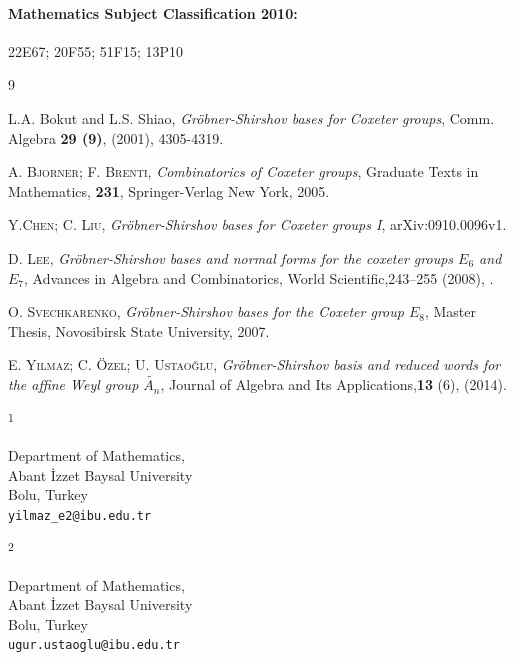 \documentclass{article}
\newcommand{\ADDRESS}[2]{\noindent
  \textsuperscript{#1}\parbox[t]{0.9\textwidth}{#2} \vspace{6pt}}
\newcommand{\MSCLASSIFICATION}[1]{\paragraph{Mathematics Subject Classification 2010:} #1}
\begin{document}
\MSCLASSIFICATION{22E67; 20F55; 51F15; 13P10}





\begin{thebibliography}{9}

 L.A. Bokut and L.S. Shiao, \emph{Gr\"{o}bner-Shirshov bases for Coxeter groups}, Comm. Algebra \textbf{29 (9)}, (2001), 4305-4319.

 \textsc{A. Bjorner;  F. Brenti}, \emph{Combinatorics of Coxeter groups}, Graduate Texts in Mathematics, \textbf{231}, Springer-Verlag New York, 2005.

 \textsc{Y.Chen; C. Liu}, \emph{Gr\"{o}bner-Shirshov bases for Coxeter groups I}, arXiv:0910.0096v1.

 \textsc{D. Lee}, \emph{Gr\"{o}bner-Shirshov bases and normal forms for the coxeter groups $E_6$ and $E_7$}, Advances in Algebra and Combinatorics, World Scientific,243--255 (2008), .


 \textsc{O. Svechkarenko}, \emph{Gr\"{o}bner-Shirshov bases for the Coxeter group $E_8$}, Master Thesis, Novosibirsk State University, 2007.

\textsc{ E. Y{\i}lmaz; C. \"{O}zel; U. Ustao\v{g}lu}, \emph{Gr\"{o}bner-Shirshov basis and reduced words for the affine Weyl group $\tilde{A_n}$}, Journal of Algebra and Its Applications,\textbf{13} (6), (2014).
\\
\end{thebibliography}

\vspace{1cm}

\ADDRESS{1}{
Department of Mathematics,\\Abant \.{I}zzet Baysal University \\
Bolu, Turkey \\
\texttt{yilmaz\_e2@ibu.edu.tr}
}

\vspace{.5cm}

\ADDRESS{2}{
Department of Mathematics,\\Abant \.{I}zzet Baysal University \\
Bolu, Turkey \\
\texttt{ugur.ustaoglu@ibu.edu.tr}
}
\end{document}

